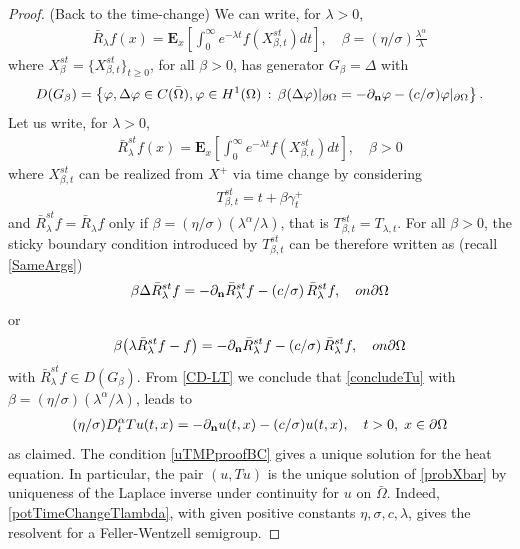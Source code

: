 \documentclass[11pt,a4paper]{article}
\begin{document}
\begin{proof}
(Back to the time-change) We can write, for $\lambda >0$,
\begin{align*}
\bar{R}_\lambda f(x) = \mathbf{E}_x \left[ \int_0^\infty e^{-\lambda t} f(X^{st}_{\beta, t}) dt \right], \quad  \beta= (\eta/\sigma) \frac{\lambda^\alpha}{\lambda}
\end{align*}
where $X^{st}_\beta = \{X^{st}_{\beta, t}\}_{t \geq 0}$, for all $\beta>0$, has generator $G_\beta =\Delta$ with
\begin{align*}
D(G_\beta) = \left\{ \varphi, \Delta \varphi \in C(\bar{\Omega}), \varphi \in H^1(\Omega)\,:\, \beta (\Delta \varphi) |_{\partial \Omega} = - \partial_{\bf n} \varphi - (c/\sigma) \varphi |_{\partial \Omega} \right\}.
\end{align*} 
Let us write, for $\lambda >0$,
\begin{align*}
\bar{R}^{st}_\lambda f(x) = \mathbf{E}_x \left[ \int_0^\infty e^{-\lambda t} f(X^{st}_{\beta, t}) dt \right], \quad \beta >0
\end{align*}
where $X^{st}_{\beta, t}$ can be realized from $X^+$ via time change by considering
\begin{align*}
T^{st}_{\beta, t} = t + \beta \gamma^+_t 
\end{align*} 
and $\bar{R}^{st}_\lambda f = \bar{R}_\lambda f$ only if $\beta= (\eta/\sigma) (\lambda^\alpha /\lambda)$, that is $T^{st}_{\beta, t} = T_{\lambda, t}$. For all $\beta > 0$, the sticky boundary condition introduced by $T^{st}_{\beta, t}$ can be therefore written as (recall \eqref{SameArgs})
\begin{align}
\label{Condsurface-RH}
\beta \Delta \bar{R}^{st}_\lambda f = - \partial_{\bf n} \bar{R}^{st}_\lambda f - (c/\sigma)\, \bar{R}^{st}_\lambda f, \quad \textrm{on } \partial \Omega
\end{align}
or
\begin{align}
\label{concludeTu}
\beta  \big( \lambda \bar{R}^{st}_\lambda f - f \big) = - \partial_{\bf n} \bar{R}^{st}_\lambda f - (c/\sigma)\, \bar{R}^{st}_\lambda f , \quad \textrm{on } \partial \Omega
\end{align}
with $\bar{R}^{st}_\lambda f \in D(G_\beta)$. From \eqref{CD-LT} we conclude that \eqref{concludeTu} with $\beta = (\eta/\sigma) (\lambda^\alpha / \lambda)$, leads to
\begin{align}
\label{uTMPproofBC}
(\eta/\sigma) D^\alpha_t Tu(t,x) = - \partial_{\bf n} u(t,x) - (c/\sigma) u(t,x), \quad t>0,\; x \in \partial \Omega
\end{align}
as claimed. The condition \eqref{uTMPproofBC} gives a unique solution for the heat equation. In particular, the pair $(u, Tu)$ is the unique solution of \eqref{probXbar} by uniqueness of the Laplace inverse under continuity for $u$ on $\bar{\Omega}$. Indeed, \eqref{potTimeChangeTlambda}, with given positive constants $\eta,\sigma, c, \lambda$, gives the resolvent for a Feller-Wentzell semigroup.
\end{proof}
\end{document}
